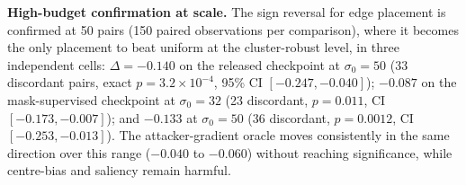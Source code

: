 \documentclass[10pt,journal]{IEEEtran}
\begin{document}
\begin{table}[t]
\centering
\caption{Placement $\Delta$ versus uniform across budgets (ResNet18, 12 pairs, gallery 48). Positive is worse privacy. Edge placement reverses sign as the budget grows; the mechanism's own learned map never improves on uniform at any budget.}
\label{tab:placement_budget}
\end{table}

\textbf{High-budget confirmation at scale.} The sign reversal for edge
placement is confirmed at 50 pairs (150 paired observations per comparison),
where it becomes the only placement to beat uniform at the cluster-robust
level, in three independent cells: $\Delta=-0.140$ on the released checkpoint
at $\sigma_0=50$ (33 discordant pairs, exact $p=3.2\times10^{-4}$, 95\% CI
$[-0.247,-0.040]$); $-0.087$ on the mask-supervised checkpoint at
$\sigma_0=32$ (23 discordant, $p=0.011$, CI $[-0.173,-0.007]$); and $-0.133$
at $\sigma_0=50$ (36 discordant, $p=0.0012$, CI $[-0.253,-0.013]$). The
attacker-gradient oracle moves consistently in the same direction over this
range ($-0.040$ to $-0.060$) without reaching significance, while centre-bias
and saliency remain harmful.
\end{document}
